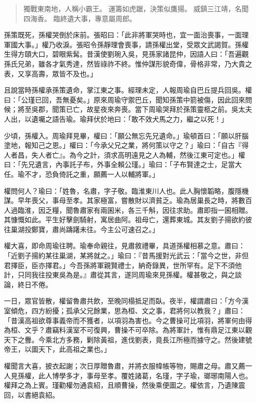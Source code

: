 \begin{quote}
獨戰東南地，人稱小霸王。
運籌如虎踞，決策似鷹揚。
威鎮三江靖，名聞四海香。
臨終遺大事，專意屬周郎。
\end{quote}

孫策既死，孫權哭倒於床前。張昭曰：「此非將軍哭時也，宜一面治喪事，一面理軍國大事。」權乃收淚。張昭令孫靜理會喪事，請孫權出堂，受眾文武謁賀。孫權生得方頤大口，碧眼紫髯。昔漢使劉琬入吳，見孫家諸昆仲，因語人曰：「吾遍觀孫氏兄弟，雖各才氣秀達，然皆祿祚不終。惟仲謀形貌奇偉，骨格非常，乃大貴之表，又享高壽，眾皆不及也。」

且說當時孫權承孫策遺命，掌江東之事。經理未定，人報周瑜自巴丘提兵回吳。權曰：「公瑾已回，吾無憂矣。」原來周瑜守禦巴丘，聞知孫策中箭被傷，因此回來問候；將至吳郡，聞策已亡，故星夜來奔喪。當下周瑜哭拜於孫策靈柩之前。吳太夫人出，以遺囑之語告瑜。瑜拜伏於地曰：「敢不效犬馬之力，繼之以死！」

少頃，孫權入。周瑜拜見畢，權曰：「願公無忘先兄遺命。」瑜頓首曰：「願以肝腦塗地，報知己之恩。」權曰：「今承父兄之業，將何策以守之？」瑜曰：「自古『得人者昌，失人者亡』。為今之計，須求高明遠見之人為輔，然後江東可定也。」權曰：「先兄遺言，內事託子布，外事全賴公瑾。」瑜曰：「子布賢達之士，足當大任。瑜不才，恐負倚託之重，願薦一人以輔將軍。」

權問何人？瑜曰：「姓魯，名肅，字子敬。臨淮東川人也。此人胸懷韜略，腹隱機謀。早年喪父，事母至孝。其家極富，嘗散財以濟貧乏。瑜為居巢長之時，將數百人過臨淮，因乏糧，聞魯肅家有兩囷米，各三千斛，因往求助。肅即指一囷相贈。其慷慨如此。平生好擊劍騎射，寓居曲阿。祖母亡，還葬東城。其友劉子揚欲約彼往巢湖投鄭寶，肅尚躊躇未往。今主公可速召之。」

權大喜，即命周瑜往聘。瑜奉命親往，見肅敘禮畢，具道孫權相慕之意。肅曰：「近劉子揚約某往巢湖，某將就之。」瑜曰：『昔馬援對光武云：「當今之世，非但君擇臣，臣亦擇君。」今吾孫將軍親賢禮士，納奇錄異，世所罕有。足下不須他計，只同我往投東吳為是。』肅從其言，遂同周瑜來見孫權。權甚敬之，與之談論，終日不倦。

一日，眾官皆散，權留魯肅共飲，至晚同榻抵足而臥。夜半，權謂肅曰：「方今漢室傾危，四方紛擾；孤承父兄餘業，思為桓、文之事，君將何以教我？」肅曰：「昔漢高祖欲尊事義帝而不獲者，以項羽為害也。今之曹操可比項羽，將軍何由得為桓、文乎？肅竊料漢室不可復興，曹操不可卒除。為將軍計，惟有鼎足江東以觀天下之釁。今乘北方多務，剿除黃祖，進伐劉表，竟長江所極而據守之。然後建號帝王，以圖天下，此高祖之業也。」

權聞言大喜，披衣起謝；次日厚贈魯肅，并將衣服幃帳等物，賜肅之母。肅又薦一人見孫權，此人博學多才，事母至孝。覆姓諸葛，名瑾，字子瑜，瑯琊南陽人也。權拜之為上賓。瑾勸權勿通袁紹，且順曹操，然後乘便圖之。權依言，乃遺陳震回，以書絕袁紹。

